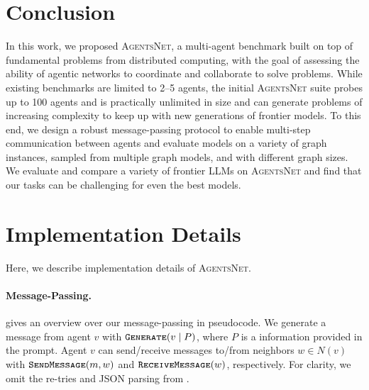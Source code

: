 \documentclass{article}
\newcommand{\benchmark}{\textsc{AgentsNet}}
\begin{document}
\section{Conclusion}
In this work, we proposed \benchmark{}, a multi-agent benchmark built on top of fundamental problems from distributed computing, with the goal of assessing the ability of agentic networks to coordinate and collaborate to solve problems. 
While existing benchmarks are limited to 2--5 agents, the initial \benchmark{} suite probes up to 100 agents and is practically unlimited in size and can generate problems of increasing complexity to keep up with new generations of frontier models.
To this end, we design a robust message-passing protocol to enable multi-step communication between agents and evaluate models on a variety of graph instances, sampled from multiple graph models, and with different graph sizes. We evaluate and compare a variety of frontier LLMs on \benchmark{} and find that our tasks can be challenging for even the best models.%





































\newpage


\newpage
\appendix

\section{Implementation Details}\label{app:implementation}
Here, we describe implementation details of \benchmark{}.

\paragraph{Message-Passing.}
 gives an overview over our message-passing in pseudocode. We generate a message from agent $v$ with $\textsc{\texttt{Generate}}(v \mid P)$, where $P$ is a information provided in the prompt. Agent $v$ can send/receive messages to/from neighbors $w \in N(v)$ with $\textsc{\texttt{SendMessage}}(m, w)$ and $\textsc{\texttt{ReceiveMessage}}(w)$, respectively. For clarity, we omit the re-tries and JSON parsing from .
\end{document}
